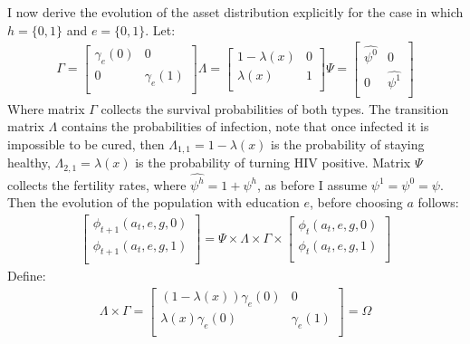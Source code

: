 I now derive the evolution of the asset distribution explicitly for the case in which $h=\{0,1\}$ and $e=\{0,1\}$.
Let:
\begin{align*}
   \Gamma=
  \left[ {\begin{array}{cc}
   \gamma_{e}(0) & 0 \\
   0 & \gamma_{e}(1) \\
  \end{array} } \right]
   \Lambda=
  \left[ {\begin{array}{cc}
   1-\lambda(x) & 0 \\
   \lambda(x) & 1 \\
  \end{array} } \right]
   \Psi=
  \left[ {\begin{array}{cc}
   \hat{\psi^{0}} & 0 \\
   0 & \hat{\psi^{1}} \\
  \end{array} } \right]
\end{align*}
Where matrix $\Gamma$ collects the survival probabilities of both types. The transition matrix $\Lambda$ contains the probabilities of infection, note that once infected it is impossible to be cured, then $\Lambda_{1,1}=1-\lambda(x)$ is the probability of staying healthy, $\Lambda_{2,1}=\lambda(x)$ is the probability of turning HIV positive. Matrix $\Psi$ collects the fertility rates, where $\hat{\psi^{h}}=1+\psi^{h}$, as before I assume $\psi^{1}=\psi^{0}=\psi$. \\
Then the evolution of the population with education $e$, before choosing $a$ follows:
\begin{align*}
\left[ {\begin{array}{c}
   \phi_{t+1}(a_{t},e,g,0)\\
   \phi_{t+1}(a_{t},e,g,1)\\
  \end{array} } \right]=\Psi\times \Lambda \times \Gamma\times 
\left[ {\begin{array}{c}
   \phi_{t}(a_{t},e,g,0)\\
   \phi_{t}(a_{t},e,g,1) \\
  \end{array} } \right] 
\end{align*}
Define:
\begin{align*}
\Lambda \times \Gamma=
\left[ {\begin{array}{cc}
   (1-\lambda(x))\gamma_{e}(0)&0\\
   \lambda(x)\gamma_{e}(0)&\gamma_{e}(1)\\
  \end{array} } \right]=\Omega
\end{align*}
